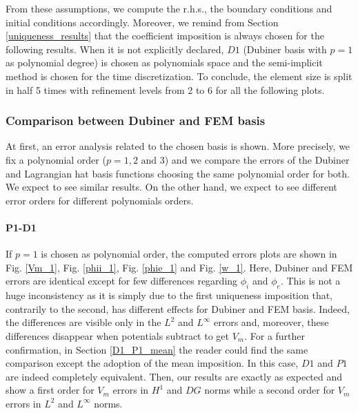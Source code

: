 \documentclass[a4paper,11pt]{article}
\begin{document}
\noindent From these assumptions, we compute the r.h.s., the boundary conditions and initial conditions accordingly. Moreover, we remind from Section \ref{uniqueness_results} that the coefficient imposition is always chosen for the following results. When it is not explicitly declared, $D1$ (Dubiner basis with $p=1$ as polynomial degree) is chosen as polynomials space and the semi-implicit method is chosen for the time discretization. To conclude, the element size is split in half 5 times with refinement levels from 2 to 6 for all the following plots.

\subsubsection{Comparison between Dubiner and FEM basis} \label{Dubiner_FEM_comparison}
At first, an error analysis related to the chosen basis is shown. More precisely, we fix a polynomial order ($p=1,2 \text{ and } 3$) and we compare the errors of the Dubiner and Lagrangian hat basis functions choosing the same polynomial order for both. We expect to see similar results. On the other hand, we expect to see different error orders for different polynomials orders.
\paragraph{P1-D1}
If $p=1$ is chosen as polynomial order, the computed errors plots are shown in Fig. \ref{Vm_1}, Fig. \ref{phii_1}, Fig. \ref{phie_1} and Fig. \ref{w_1}. 
\noindent Here, Dubiner and FEM errors are identical except for few differences regarding $\phi_i$ and $\phi_e$. This is not a huge inconsistency as it is simply due to the first uniqueness imposition that, contrarily to the second, has different effects for Dubiner and FEM basis. Indeed, the differences are visible only in the $L^2$ and $L^\infty$ errors and, moreover, these differences disappear when potentials subtract to get $V_m$. For a further confirmation, in Section \ref{D1_P1_mean} the reader could find the same comparison except the adoption of the mean imposition. In this case, $D1$ and $P1$ are indeed completely equivalent. Then, our results are exactly as expected and show a first order for $V_m$ errors in $H^1$ and $DG$ norms while a second order for $V_m$ errors in $L^2$ and $L^\infty$ norms.
\end{document}
